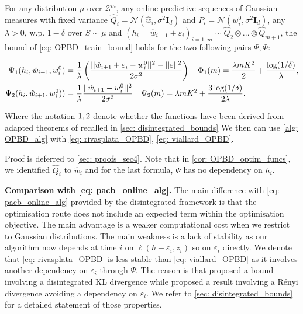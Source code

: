 \begin{corollary}
  \label{cor: OPBD_optim_funcs}
  For any distribution $\mu$ over $\mathcal{Z}^m$, any online predictive sequences of Gaussian measures with fixed variance $\hat{Q}_i= \mathcal{N}(\hat{w}_i, \sigma^2\mathbf{I}_d)$ and $P_i= \mathcal{N}(w_i^0,\sigma^2\mathbf{I}_d)$, any $\lambda>0$, w.p. $1-\delta$ over $S\sim\mu$ and $(h_i=\hat{w}_{i+1} + \varepsilon_i)_{i=1..m}\sim \hat{Q}_2\otimes...\otimes \hat{Q}_{m+1}$,
  the bound of \cref{eq: OPBD_train_bound} holds for the two following pairs $\Psi,\Phi$:

\begin{align}
  \label{eq: rivasplata_OPBD}
     \Psi_{\normalfont1}(h_i,\hat{w}_{i+1}, w_i^0) & = \frac{1}{\lambda}\left( \frac{||\hat{w}_{i+1} + \varepsilon_i- w_i^0||^2 - ||\varepsilon||^2}{2\sigma^2} \right) \quad \Phi_{\normalfont1}(m) = \frac{\lambda m K^2}{2} + \frac{\log(1/\delta)}{\lambda},\\
    \label{eq: viallard_OPBD}
    \Psi_{\normalfont2}(h_i, \hat{w}_{i+1}, w_i^0)) &  = \frac{1}{\lambda}\frac{||\hat{w}_{i+1}-w_i^0||^2}{2\sigma^2} \quad \Psi_{\normalfont2}(m) = \lambda m K^2 + \frac{3\log(1/\delta)}{2\lambda}.
  \end{align}

  Where the notation $\normalfont1, \normalfont2$ denote whether the functions have been derived from adapted theorems of \citealp{rivasplata2020pac,viallard2023general} recalled in \cref{sec: disintegrated_bounds}
  We then can use \cref{alg: OPBD_alg} with  \cref{eq: rivasplata_OPBD}, \cref{eq: viallard_OPBD}.

\end{corollary}

Proof is deferred to \cref{sec: proofs_sec4}. Note that in \cref{cor: OPBD_optim_funcs}, we identified $\hat{Q}_i$ to $\hat{w}_i$ and for the last formula, $\Psi$ has no dependency on $h_i$.

\textbf{Comparison with \cref{eq: pacb_online_alg}.} The main difference with \cref{eq: pacb_online_alg} provided by the disintegrated framework is that the optimisation route does not include an expected term within the optimisation objective. The main advantage is a weaker computational cost when we restrict to Gaussian distributions. The main weakness is a lack of stability as our algorithm now depends at time $i$ on $\ell(h+\varepsilon_i,z_i)$ so on $\varepsilon_i$ directly.
We denote that \cref{eq: rivasplata_OPBD} is less stable than \cref{eq: viallard_OPBD} as it involves another dependency on $\varepsilon_i$ through $\Psi$.
The reason is that \cite{rivasplata2020pac} proposed a bound involving a disintegrated KL divergence while \cite{viallard2023general} proposed a result involving a Rényi divergence avoiding a dependency on $\varepsilon_i$. We refer to \cref{sec: disintegrated_bounds} for a detailed statement of those properties.

